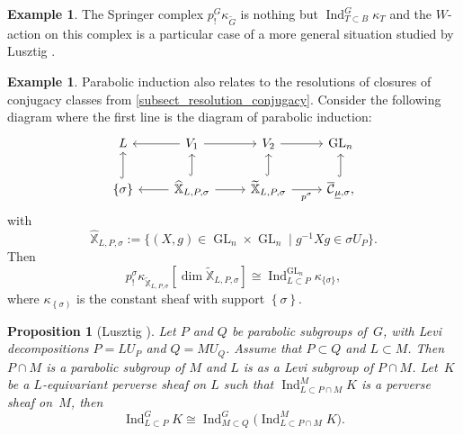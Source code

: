 \documentclass[JEP,XML,SOM,NoEqCountersInSection,Unicode,published]{cedram}
\theoremstyle{definition}
\newtheorem{example}[definition]{Example}
\theoremstyle{plain}
\newtheorem{proposition}[definition]{Proposition}
\DeclareMathOperator{\Ind}{Ind}
\DeclareMathOperator{\GL}{GL}
\newcommand{\inv}{^{-1}}
\begin{document}
\begin{example}
The Springer complex $p^G_! \kappa_{\widetilde{G}}$ is nothing but $\Ind_{T\subset B}^G \kappa_T$ and the $W$-action on this complex is a particular case of a more general situation studied by Lusztig \cite{Lusztig1986}.
\end{example}
\begin{example}\label{example_induction_resolution}
Parabolic induction also relates to the resolutions of closures of conjugacy classes from \ref{subsect_resolution_conjugacy}.
Consider the following diagram where the first line is the diagram of parabolic induction:
\begin{equation*}
\begin{tikzcd}
L & \arrow[l,swap] V_1 \arrow[r] & V_2 \arrow[r] & \GL_n \\
\left\lbrace \sigma\right\rbrace \arrow[u,hookrightarrow] &\arrow[l]\arrow[r] \arrow[u,hookrightarrow] \widehat{\mathbb{X}}_{L,P, \sigma} & \arrow[r,swap,"p^{\sigma}"] \arrow[u,hookrightarrow] \mathbb{\widetilde{X}}_{L,P, \sigma} &\arrow[u,hookrightarrow] \overline{\mathcal{C}}_{\underline{\mu},\sigma},
\end{tikzcd}
\end{equation*}
with
\[
\mathbb{\widehat{X}}_{L,P,\sigma} :=\lbrace (X, g) \in \GL_n \times \GL_n \mid g\inv X g \in \sigma U_P\rbrace.
\]
Then
\[
p_!^{\sigma} \kappa_{\mathbb{\widetilde{X}}_{L,P,\sigma}}[\dim \mathbb{\widetilde{X}}_{L,P,\sigma}] \cong \Ind_{L\subset P}^{\GL_n}\kappa_{\lbrace\sigma\rbrace},
\]
where $\kappa_{\left\lbrace\sigma\right)}$ is the constant sheaf with support $\left\lbrace \sigma\right\rbrace$.
\end{example}

\begin{proposition}[Lusztig {\cite[I-4.2]{lusztig_character_sheaves}}]\label{prop_trans_ind}
Let $P$ and $Q$ be parabolic subgroups of~$G$, with Levi decompositions $P=L U_P$ and $Q=M U_Q$. Assume that $P\subset Q$ and $L\subset M$. Then $P\cap M$ is a parabolic subgroup of $M$ and $L$ is as a Levi subgroup of $P\cap M$. Let~$K$ be a $L$-equivariant perverse sheaf on $L$ such that $\Ind_{L\subset P\cap M}^{M} K$ is a perverse sheaf on~$M$, then
\begin{equation*}
\Ind_{L\subset P}^{G} K\cong \Ind_{M\subset Q}^{G}\bigl(\Ind_{L\subset P\cap M}^{M} K\bigr).
\end{equation*}
\end{proposition}
\end{document}
